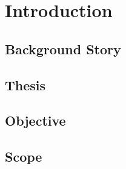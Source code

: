 \section{Introduction}

\subsection{Background Story}
\subsection{Thesis}
\subsection{Objective}
\subsection{Scope}
